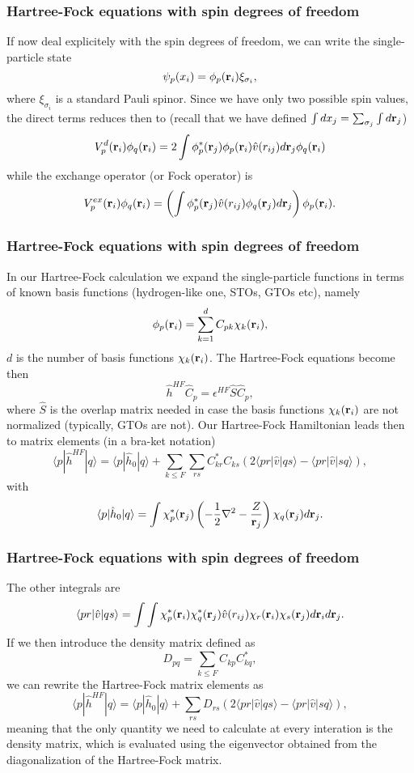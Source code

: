 \frame
{
  \frametitle{Hartree-Fock equations with spin degrees of freedom}
\begin{small}
{\scriptsize
If now deal explicitely with the spin degrees of freedom, we can write the single-particle state
\[
\psi_{p}(x_i) = \phi_{p}({\bf r}_i)\xi_{\sigma_i},
\]
where $\xi_{\sigma_i}$ is a standard Pauli spinor. Since we have only two possible spin values, the direct terms reduces then to
(recall that we have defined $\int dx_j = \sum_{\sigma_j} \int d{\bf r}_j$)
\begin{equation*}
  V_{p}^{d}({\bf r}_i)\phi_{q}({\bf r}_i) = 2\int \phi_{p}^*({\bf r}_j)\phi_{p}({\bf r}_i)\hat{v}(r_{ij}) d{\bf r}_j\phi_{q}({\bf r}_i)
\end{equation*}
while the exchange operator (or Fock operator) is
\begin{equation*}
  V_{p}^{ex}({\bf r}_i) \phi_{q}({\bf r}_i) 
  = \left(\int \phi_{p}^*({\bf r}_j) 
  \hat{v}(r_{ij})\phi_{q}({\bf r}_j)
  d{\bf r}_j\right)\phi_{p}({\bf r}_i).
\end{equation*}
}
\end{small}
}



\frame
{
  \frametitle{Hartree-Fock equations with spin degrees of freedom}
\begin{small}
{\scriptsize
In our Hartree-Fock calculation we expand the single-particle functions in terms of known basis functions (hydrogen-like one, STOs, GTOs etc), namely
\[
\phi_{p}({\bf r}_i) = \sum_{k=1}^{d}C_{pk}\chi_k({\bf r}_i),
\]
$d$ is the number of basis functions $\chi_k({\bf r}_i)$. The Hartree-Fock equations become then
\[
\hat{h}^{HF}\hat{C}_p=\epsilon^{HF}\hat{S}\hat{C}_p,
\]
where $\hat{S}$ is the overlap matrix needed in case the basis functions $\chi_k({\bf r}_i)$ are not normalized (typically, GTOs are not). 
Our Hartree-Fock Hamiltonian leads then to matrix elements (in a bra-ket notation)
\[
\langle p | \hat{h}^{HF} | q \rangle = \langle p|\hat{h}_0|q\rangle +\sum_{k\le F}\sum_{rs}C_{kr}^*C_{ks}\left(2\langle pr | \hat{v}|qs\rangle-\langle pr | \hat{v}|sq\rangle\right),
\]
with 
\[
\langle p|\hat{h}_0|q\rangle = \int \chi_{p}^*({\bf r}_j)\left(-\frac{1}{2}\nabla^2-\frac{Z}{{\bf r}_j}  \right)\chi_{q}({\bf r}_j)
  d{\bf r}_j.
\]
}
\end{small}
}


\frame
{
  \frametitle{Hartree-Fock equations with spin degrees of freedom}
\begin{small}
{\scriptsize
The other integrals are
\[
\langle pr | \hat{v}|qs\rangle = \int\int \chi_{p}^*({\bf r}_i)\chi_{q}^*({\bf r}_j)\hat{v}(r_{ij})\chi_{r}({\bf r}_i)\chi_{s}({\bf r}_j)
  d{\bf r}_id{\bf r}_j.
\]
If we then introduce the density matrix defined as 
\[
D_{pq}=\sum_{k\le F}C_{kp}C_{kq}^*,
\]
we can rewrite the Hartree-Fock matrix elements as
\[
\langle p | \hat{h}^{HF} | q \rangle = \langle p|\hat{h}_0|q\rangle +\sum_{rs}D_{rs}\left(2\langle pr | \hat{v}|qs\rangle-\langle pr | \hat{v}|sq\rangle\right),
\]
meaning that the only quantity we need to calculate at every
interation is the density matrix, which is evaluated using the eigenvector 
obtained from the diagonalization of the Hartree-Fock matrix.
}
\end{small}
}


